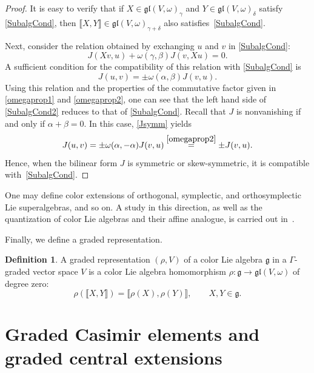 \documentclass[pdftex]{sigma}
\numberwithin{equation}{section}
\theoremstyle{definition}
\newtheorem{Definition}[Theorem]{Definition}
\def\g{\mathfrak{g}}
\def\gl{\mathfrak{gl}}
\begin{document}
\begin{proof}
	It is easy to verify that if $ X \in \gl(V,\omega)_{\gamma} $ and $ Y \in \gl(V,\omega)_{\delta}$ satisfy \eqref{SubalgCond}, then $ \llbracket X, Y \rrbracket \in \gl(V,\omega)_{\gamma+\delta}$ also satisfies~\eqref{SubalgCond}.
	
	Next, consider the relation obtained by exchanging $ u $ and $ v $ in \eqref{SubalgCond}:
	\begin{equation}
		J(Xv,u) + \omega(\gamma,\beta) J(v, Xu) = 0. \label{SubalgCond2}
	\end{equation}
	A sufficient condition for the compatibility of this relation with \eqref{SubalgCond} is
	\begin{equation}
		J(u,v) = \pm \omega(\alpha,\beta) J(v,u). \label{Jsymm}
	\end{equation}
	Using this relation and the properties of the commutative factor given in \eqref{omegaprop1} and \eqref{omegaprop2}, one can see that the left hand side of \eqref{SubalgCond2} reduces to that of \eqref{SubalgCond}.
	Recall that $ J$ is nonvanishing if and only if $ \alpha + \beta = 0.$
	In this case, \eqref{Jsymm} yields
	\begin{equation*}
		J(u,v) = \pm \omega(\alpha,-\alpha) J(v,u) \stackrel{\eqref{omegaprop2}}{=} \pm J(v,u).
	\end{equation*}
Hence, when the bilinear form $J$ is symmetric or skew-symmetric, it is compatible with~\eqref{SubalgCond}.
\end{proof}

One may define color extensions of orthogonal, symplectic, and orthosymplectic Lie superalgebras, and so on.
A study in this direction, as well as the quantization of color Lie algebras and their affine analogue, is carried out in~\cite{zhang2026}.

Finally, we define a graded representation.

\begin{Definition}
	A graded representation $(\rho,V) $ of a color Lie algebra $\g$ in a $\Gamma$-graded vector space $V$ is a color Lie algebra homomorphism $ \rho\colon \g \to \gl(V,\omega)$ of degree zero:
	\begin{equation*}
		\rho(\llbracket X, Y \rrbracket) = \llbracket \rho(X), \rho(Y) \rrbracket,
		\qquad X, Y \in \g.
	\end{equation*}
\end{Definition}

\section{Graded Casimir elements and graded central extensions} \label{SEC:Method}
\end{document}
